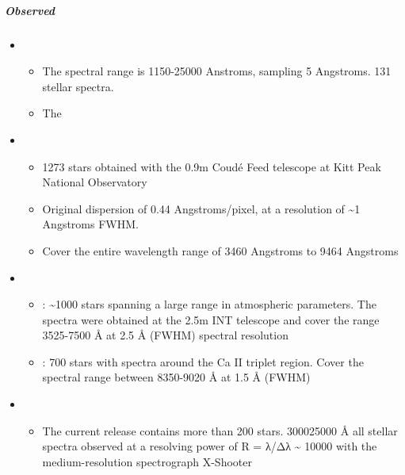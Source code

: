 \documentclass[letterpaper,10pt,english]{sphinxmanual}
\begin{document}
\subparagraph{Observed}
\label{\detokenize{resource/astro/topics/stellar_and_spops:observed}}\begin{itemize}
\item {} 
\begin{itemize}
\item {} 
The spectral range is 1150-25000 Anstroms, sampling 5 Angstroms.
131 stellar spectra.

\item {} 
The 

\end{itemize}

\item {} 
\begin{itemize}
\item {} 
1273 stars obtained with the 0.9m Coudé Feed telescope at Kitt
Peak National Observatory

\item {} 
Original dispersion of 0.44 Angstroms/pixel, at a resolution of \textasciitilde{}1
Angstroms FWHM.

\item {} 
Cover the entire wavelength range of 3460 Angstroms to 9464
Angstroms

\end{itemize}

\item {} 
\begin{itemize}
\item {} 
: \textasciitilde{}1000 stars spanning a large range in atmospheric
parameters. The spectra were obtained at the 2.5m INT telescope
and cover the range 3525-7500 Å at 2.5 Å (FWHM) spectral
resolution

\item {} 
: 700 stars with spectra around the Ca II
triplet region. Cover the spectral range between 8350-9020 Å at
1.5 Å (FWHM)

\end{itemize}

\item {} 
\begin{itemize}
\item {} 
The current release contains more than 200 stars. 3000\textendash{}25000 Å all
stellar spectra observed at a resolving power of R = λ/Δλ \textasciitilde{} 10000
with the medium-resolution spectrograph X-Shooter


\end{itemize}
\end{itemize}
\end{document}
